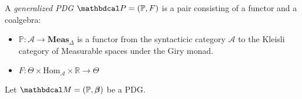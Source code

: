 \documentclass{article}
\begin{document}
	\begin{defn}
		A \emph{generalized PDG} $\dg P = (\mathbb P, F)$ is a pair consisting of a functor and a coalgebra:
		\begin{itemize}
			\item $\mathbb P : \mathcal A \to \mathbf{Meas}_{\Delta}$ is a functor from the syntacticic category $\mathcal A$ to the Kleisli category of Measurable spaces under the Giry monad.
			\item $F : \Theta \times \mathrm{Hom}_{\mathcal A} \times \mathbb R  \to \Theta$
		\end{itemize}
	\end{defn}

	\begin{prop}
		Let $\dg M = (\mathbb P, \bbeta)$ be a PDG. 
	\end{prop}
\end{document}
